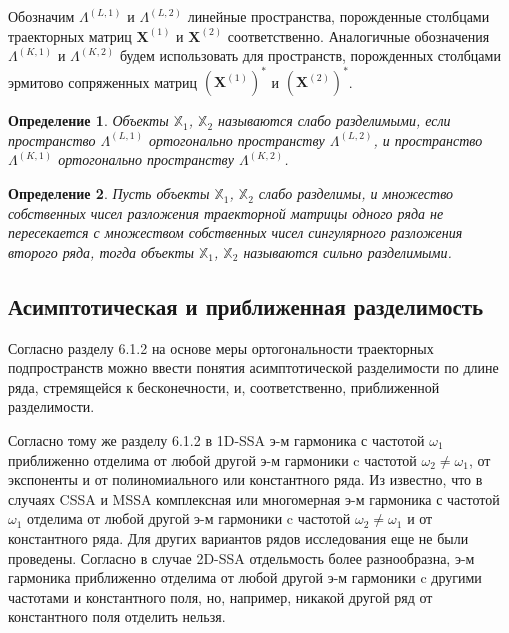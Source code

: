 \documentclass[specialist,
               substylefile = spbu.rtx,
               subf,href,colorlinks=true, 12pt]{disser}
\newtheorem{defn}{Определение}
\begin{document}
Обозначим  $\Lambda^{(L,1)}$  и $\Lambda^{(L,2)}$  линейные пространства, порожденные столбцами траекторных матриц   $\mathbf{X}^{(1)}$  и  $\mathbf{X}^{(2)}$  соответственно. Аналогичные обозначения  $\Lambda^{(K,1)}$  и $\Lambda^{(K,2)}$  будем использовать для пространств, порожденных столбцами эрмитово сопряженных матриц $(\mathbf{X}^{(1)})^\mathrm{*}$  и  $(\mathbf{X}^{(2)})^\mathrm{*}$.

\begin{defn}
Объекты $\mathbb{X}_1$,  $\mathbb{X}_2$ называются \emph{слабо разделимыми}, если пространство $\Lambda^{(L,1)}$ ортогонально пространству $\Lambda^{(L,2)}$, и пространство $\Lambda^{(K,1)}$  ортогонально пространству $\Lambda^{(K,2)}$.
\end{defn}

\begin{defn}
Пусть объекты $\mathbb{X}_1$,  $\mathbb{X}_2$ слабо разделимы, и множество собственных чисел разложения
 траекторной матрицы одного ряда не пересекается с множеством собственных чисел сингулярного разложения второго ряда,
 тогда объекты $\mathbb{X}_1$,  $\mathbb{X}_2$ называются \emph{сильно разделимыми}.
\end{defn}

\subsection{Асимптотическая и приближенная разделимость}
Согласно разделу 6.1.2 \cite{Golyandina.etal2001} на основе меры ортогональности траекторных подпространств можно ввести понятия асимптотической разделимости по длине ряда, стремящейся к бесконечности, и, соответственно, приближенной разделимости.

Согласно тому же разделу 6.1.2 \cite{Golyandina.etal2001} в 1D-SSA э-м гармоника с частотой $\omega_1$ приближенно отделима от любой другой э-м гармоники c частотой $\omega_2 \not = \omega_1$, от экспоненты и от полиномиального или константного ряда.
Из \cite{Golyandina.etal2003} известно, что в  случаях CSSA и MSSA комплексная или многомерная э-м гармоника с частотой $\omega_1$ отделима от любой другой э-м гармоники c частотой $\omega_2 \not = \omega_1$ и от константного ряда. Для других вариантов рядов исследования еще не были проведены.  
Согласно \cite{Golyandina.Usevich2010} в случае 2D-SSA отдельмость более разнообразна, 
 э-м гармоника  приближенно отделима от любой другой э-м гармоники c другими частотами и константного поля, но, например, никакой другой ряд от константного поля отделить нельзя.  
\end{document}
